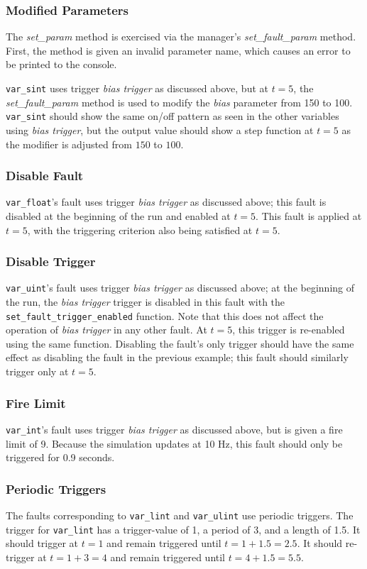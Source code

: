 \documentclass[11pt,fleqn]{report}
\begin{document}
\subsubsection {Modified Parameters}
The \textit{set\_param} method is exercised via the manager's
\textit{set\_fault\_param} method.
First, the method is given an invalid parameter name, which causes an error to
be printed to the console.

\verb"var_sint" uses trigger \textit{bias trigger} as discussed above, but at
$t=5$, the \textit{set\_fault\_param} method is used to modify the \textit{bias}
parameter from 150 to 100. \verb"var_sint" should show the same on/off pattern
as seen in the other variables using \textit{bias trigger}, but the output value
should show a step function at $t=5$ as the modifier is adjusted from $150$
to $100$.

\subsubsection{Disable Fault}
\verb"var_float"'s fault uses trigger \textit{bias trigger} as discussed above;
this fault is disabled at the beginning of the run and enabled at $t=5$. This
fault is applied at $t=5$, with the triggering criterion also being satisfied at
$t=5$.

\subsubsection{Disable Trigger}
\verb"var_uint"'s fault uses trigger \textit{bias trigger} as discussed above;
at the beginning of the run, the \textit{bias trigger} trigger is disabled in
this fault with the \verb'set_fault_trigger_enabled' function. Note that this
does not affect the operation of \textit{bias trigger} in any other fault. At
$t=5$, this trigger is re-enabled using the same function. Disabling the fault's
only trigger should have the same effect as disabling the fault in the
previous example; this fault should similarly trigger only at $t=5$.


\subsubsection {Fire Limit}
\verb"var_int"'s fault uses trigger \textit{bias trigger} as discussed above,
but is given a fire limit of 9.
Because the simulation updates at 10 Hz, this fault should only be triggered for
0.9 seconds.

\subsubsection {Periodic Triggers}
\par The faults corresponding to \verb"var_lint" and \verb"var_ulint" use
periodic triggers.
The trigger for \verb"var_lint" has a trigger-value of 1, a period of 3, and a
length of 1.5. It should trigger at $t=1$ and remain triggered until
$t=1+1.5=2.5$. It should re-trigger at $t=1+3=4$ and remain triggered until
$t=4+1.5=5.5$.
\end{document}
